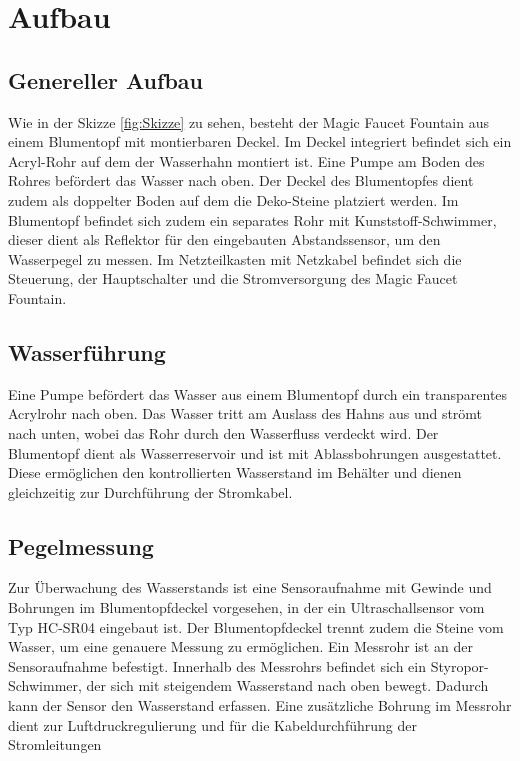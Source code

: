 %
%

\chapter{Aufbau}
\section{Genereller Aufbau}
Wie in der Skizze \ref{fig:Skizze} zu sehen, besteht der Magic Faucet Fountain aus einem Blumentopf mit montierbaren Deckel. Im Deckel integriert befindet sich ein Acryl-Rohr auf dem der Wasserhahn montiert ist. Eine Pumpe am Boden des Rohres befördert das Wasser nach oben. Der Deckel des Blumentopfes dient zudem als doppelter Boden auf dem die Deko-Steine platziert werden. Im Blumentopf befindet sich zudem ein separates Rohr mit Kunststoff-Schwimmer, dieser dient als Reflektor für den eingebauten Abstandssensor, um den Wasserpegel zu messen. Im Netzteilkasten mit Netzkabel befindet sich die Steuerung, der Hauptschalter und die Stromversorgung des Magic Faucet Fountain.

\section{Wasserführung}
Eine Pumpe befördert das Wasser aus einem Blumentopf durch ein transparentes Acrylrohr nach oben. Das Wasser tritt am Auslass des Hahns aus und strömt nach unten, wobei das Rohr durch den Wasserfluss verdeckt wird.
Der Blumentopf dient als Wasserreservoir und ist mit Ablassbohrungen ausgestattet. Diese ermöglichen den kontrollierten Wasserstand im Behälter und dienen gleichzeitig zur Durchführung der Stromkabel.

\section{Pegelmessung}
Zur Überwachung des Wasserstands ist eine Sensoraufnahme mit Gewinde und Bohrungen im Blumentopfdeckel vorgesehen, in der ein Ultraschallsensor vom Typ HC-SR04 eingebaut ist. Der Blumentopfdeckel trennt zudem die Steine vom Wasser, um eine genauere Messung zu ermöglichen.
Ein Messrohr ist an der Sensoraufnahme befestigt. Innerhalb des Messrohrs befindet sich ein Styropor-Schwimmer, der sich mit steigendem Wasserstand nach oben bewegt. Dadurch kann der Sensor den Wasserstand erfassen. Eine zusätzliche Bohrung im Messrohr dient zur Luftdruckregulierung und für die Kabeldurchführung der Stromleitungen

